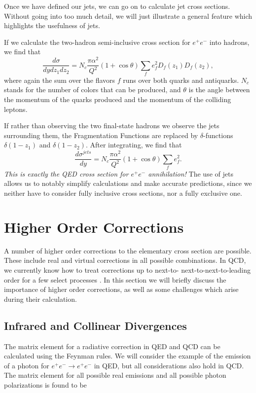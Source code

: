 \documentclass[10pt,a4paper]{book}
\begin{document}
Once we have defined our jets, we can go on to calculate jet cross sections. Without going into too much detail, we will just illustrate a general feature which highlights the usefulness of jets. 

If we calculate the two-hadron semi-inclusive cross section for $e^+e^-$ into hadrons, we find that
\begin{equation}
\frac{d\sigma}{dydz_1dz_2} = N_c \frac{\pi \alpha^2}{Q^2} \left(1 + \cos\theta \right) \sum_f e_f^2 D_f(z_1) D_f(z_2),
\end{equation}
where again the sum over the flavors $f$ runs over both quarks and antiquarks. $N_c$ stands for the number of colors that can be produced, and $\theta$ is the angle between the momentum of the quarks produced and the momentum of the colliding leptons.

If rather than observing the two final-state hadrons we observe the jets surrounding them, the Fragmentation Functions are replaced by $\delta$-functions $\delta(1 - z_1)$ and $\delta(1 - z_2)$. After integrating, we find that
\begin{equation}
\frac{d\sigma^{jets}}{dy} = N_c \frac{\pi \alpha^2}{Q^2} \left(1 + \cos\theta \right) \sum_f e_f^2.
\end{equation}
\emph{This is exactly the QED cross section for $e^+e^-$ annihilation!} The use of jets allows us to notably simplify calculations and make accurate predictions, since we neither have to consider fully inclusive cross sections, nor a fully exclusive one.
 
\section{Higher Order Corrections}

A number of higher order corrections to the elementary cross section are possible. These include real and virtual corrections in all possible combinations. In QCD, we currently know how to treat corrections up to next-to-
next-to-next-to-leading order for a few select processes \cite{DUHR20162128, Anastasiou:2015vya}. In this section we will briefly discuss the importance of higher order corrections, as well as some challenges which arise during their calculation.

\subsection{Infrared and Collinear Divergences}
The matrix element for a radiative correction in QED and QCD can be calculated using the Feynman rules. We will consider the example of the emission of a photon for $e^+e^- \rightarrow e^+e^-$ in QED, but all considerations also hold in QCD. The matrix element for all possible real emissions and all possible photon polarizations is found to be
\end{document}
